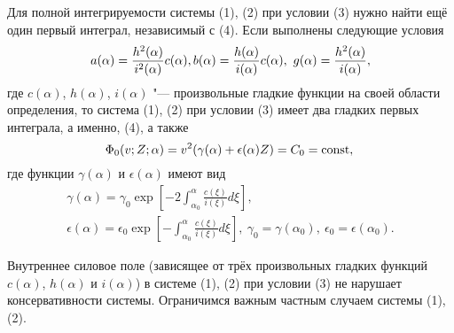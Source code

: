 Для полной интегрируемости системы (1), (2) при условии (3) нужно
найти ещё один первый интеграл, независимый с (4).
Если выполнены следующие условия
$$
a(\alpha)=\frac{h^2(\alpha)}{i^2(\alpha)}c(\alpha),\\
b(\alpha)=\frac{h(\alpha)}{i(\alpha)}c(\alpha),~g(\alpha)=\frac{h^2(\alpha)}{i(\alpha)},
$$
где $c(\alpha)$, $h(\alpha)$, $i(\alpha)$ "--- произвольные гладкие
функции на своей области определения, то система (1), (2) при
условии (3) имеет два гладких первых интеграла, а именно, (4), а
также
$$
\Phi_0(v;Z;\alpha)=v^2(\gamma(\alpha)+\epsilon(\alpha)Z)=C_0=\textrm{const},\\
$$
где функции $\gamma(\alpha)$ и $\epsilon(\alpha)$ имеют вид
$$
\begin{array}{c}
\gamma(\alpha)=\gamma_0\exp\left[-2\int_{\alpha_0}^{\alpha}\frac{c(\xi)}{i(\xi)}d\xi\right],\\
\epsilon(\alpha)=\epsilon_0\exp\left[-\int_{\alpha_0}^{\alpha}\frac{c(\xi)}{i(\xi)}d\xi\right],~
\gamma_0=\gamma(\alpha_0),~\epsilon_0=\epsilon(\alpha_0).
\end{array}
$$



Внутреннее силовое поле (зависящее от трёх произвольных гладких
функций $c(\alpha)$, $h(\alpha)$ и $i(\alpha)$) в системе (1), (2)
при условии (3) не нарушает консервативности системы. Ограничимся
важным частным случаем системы (1), (2).

